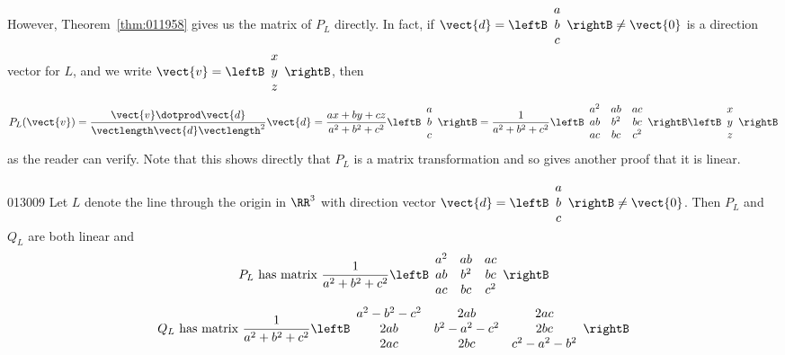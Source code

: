  However, Theorem~\ref{thm:011958} gives us the matrix of $P_{L}$ directly. In fact, if 
 $\vect{d} = \leftB
 \begin{array}{c}
 a \\
 b \\
 c
 \end{array}
 \rightB \neq \vect{0}$
 is a direction vector for $L$, and we write 
$\vect{v} = \leftB
\begin{array}{c}
x \\
y \\
z
\end{array}
\rightB$, then
\begin{equation*}
P_{L}(\vect{v}) = \frac{\vect{v} \dotprod \vect{d}}{\vectlength \vect{d} \vectlength^2}\vect{d} = \frac{ax + by + cz}{a^2 + b^2 + c^2} \leftB
\begin{array}{c}
a \\
b \\
c
\end{array}
\rightB = \frac{1}{a^2 + b^2 + c^2} \leftB
\begin{array}{ccc}
a^2 & ab & ac \\
ab & b^2 & bc \\
ac & bc & c^2
\end{array}
\rightB \leftB
\begin{array}{c}
x \\
y \\
z
\end{array}
\rightB
\end{equation*}
as the reader can verify. Note that this shows directly that $P_{L}$ is a matrix transformation and so gives another proof that it is linear.


\begin{theorem}{}{013009}
Let $L$ denote the line through the origin in $\RR^3$ with direction vector $\vect{d} = \leftB
\begin{array}{c}
a \\
b \\
c
\end{array}
\rightB \neq \vect{0}$. Then $P_{L}$ and $Q_{L}$ are both linear and
\begin{equation*}
P_{L} \mbox{ has matrix }\frac{1}{a^2 + b^2 + c^2} \leftB
\begin{array}{ccc}
a^2 & ab & ac \\
ab & b^2 & bc \\
ac & bc & c^2
\end{array}
\rightB
\end{equation*}
\begin{equation*}
Q_{L} \mbox{ has matrix }\frac{1}{a^2 + b^2 + c^2} \leftB
\begin{array}{ccc}
a^2 - b^2 - c^2 & 2ab & 2ac \\
2ab & b^2 - a^2 - c^2 & 2bc \\
2ac & 2bc & c^2 - a^2 - b^2
\end{array}
\rightB
\end{equation*}
\end{theorem}

